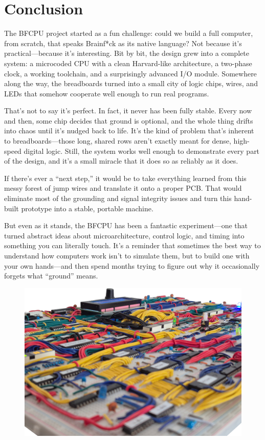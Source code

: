 \section{Conclusion}
The BFCPU project started as a fun challenge: could we build a full computer, from scratch, that speaks Brainf*ck as its native language? Not because it’s practical—because it’s interesting. Bit by bit, the design grew into a complete system: a microcoded CPU with a clean Harvard-like architecture, a two-phase clock, a working toolchain, and a surprisingly advanced I/O module. Somewhere along the way, the breadboards turned into a small city of logic chips, wires, and LEDs that somehow cooperate well enough to run real programs.

That’s not to say it’s perfect. In fact, it never has been fully stable. Every now and then, some chip decides that ground is optional, and the whole thing drifts into chaos until it’s nudged back to life. It’s the kind of problem that’s inherent to breadboards—those long, shared rows aren’t exactly meant for dense, high-speed digital logic. Still, the system works well enough to demonstrate every part of the design, and it’s a small miracle that it does so as reliably as it does.

If there’s ever a “next step,” it would be to take everything learned from this messy forest of jump wires and translate it onto a proper PCB. That would eliminate most of the grounding and signal integrity issues and turn this hand-built prototype into a stable, portable machine.

But even as it stands, the BFCPU has been a fantastic experiment—one that turned abstract ideas about microarchitecture, control logic, and timing into something you can literally touch. It’s a reminder that sometimes the best way to understand how computers work isn’t to simulate them, but to build one with your own hands—and then spend months trying to figure out why it occasionally forgets what “ground” means.
\vspace{2cm}

\begin{figure}[H]
  \centering
  \includegraphics[width=\textwidth]{img/final_img}
\end{figure}


